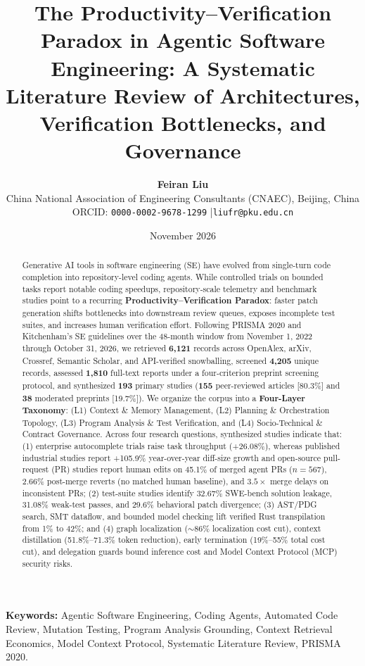 \documentclass[10pt,twocolumn,a4paper]{article}
\title{\LARGE \textbf{The Productivity--Verification Paradox in Agentic Software Engineering: A Systematic Literature Review of Architectures, Verification Bottlenecks, and Governance}}
\author{
    \textbf{Feiran Liu}\\
    \small China National Association of Engineering Consultants (CNAEC), Beijing, China\\
    \small ORCID: \texttt{0000-0002-9678-1299} \quad|\quad \texttt{liufr@pku.edu.cn}
}
\date{November 2026}
\begin{document}
\maketitle

\begin{abstract}
Generative AI tools in software engineering (SE) have evolved from single-turn code completion into repository-level coding agents. While controlled trials on bounded tasks report notable coding speedups, repository-scale telemetry and benchmark studies point to a recurring \textbf{Productivity--Verification Paradox}: faster patch generation shifts bottlenecks into downstream review queues, exposes incomplete test suites, and increases human verification effort. Following PRISMA 2020 and Kitchenham's SE guidelines over the 48-month window from November 1, 2022 through October 31, 2026, we retrieved \textbf{6,121} records across OpenAlex, arXiv, Crossref, Semantic Scholar, and API-verified snowballing, screened \textbf{4,205} unique records, assessed \textbf{1,810} full-text reports under a four-criterion preprint screening protocol, and synthesized \textbf{193} primary studies (\textbf{155} peer-reviewed articles [80.3\%] and \textbf{38} moderated preprints [19.7\%]). We organize the corpus into a \textbf{Four-Layer Taxonomy}: (L1) Context \& Memory Management, (L2) Planning \& Orchestration Topology, (L3) Program Analysis \& Test Verification, and (L4) Socio-Technical \& Contract Governance. Across four research questions, synthesized studies indicate that: (1) enterprise autocomplete trials raise task throughput (+26.08\%), whereas published industrial studies report +105.9\% year-over-year diff-size growth and open-source pull-request (PR) studies report human edits on 45.1\% of merged agent PRs ($n=567$), 2.66\% post-merge reverts (no matched human baseline), and $3.5\times$ merge delays on inconsistent PRs; (2) test-suite studies identify 32.67\% SWE-bench solution leakage, 31.08\% weak-test passes, and 29.6\% behavioral patch divergence; (3) AST/PDG search, SMT dataflow, and bounded model checking lift verified Rust transpilation from 1\% to 42\%; and (4) graph localization ($\sim$86\% localization cost cut), context distillation (51.8\%--71.3\% token reduction), early termination (19\%--55\% total cost cut), and delegation guards bound inference cost and Model Context Protocol (MCP) security risks.
\end{abstract}

\vspace{0.4em}
\noindent\textbf{Keywords:} Agentic Software Engineering, Coding Agents, Automated Code Review, Mutation Testing, Program Analysis Grounding, Context Retrieval Economics, Model Context Protocol, Systematic Literature Review, PRISMA 2020.
\end{document}

